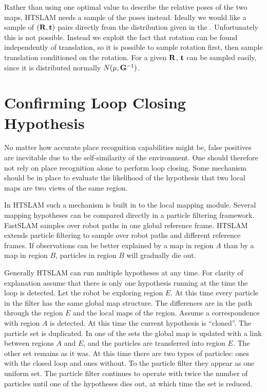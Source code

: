 Rather than using one optimal value to describe the relative poses of
the two maps, HTSLAM needs a sample of the poses instead. Ideally we
would like a sample of $({\bf R,t})$ pairs directly from the
distribution given in the . Unfortunately
this is not possible. Instead we exploit the fact that rotation
can be found independently of translation, so it is possible to sample
rotation first, then sample translation conditioned on the
rotation. For a given ${\bf R}$, ${\bf t}$ can be sampled easily,
since it is distributed normally $N(\mu, {\bf G}^{-1})$.



\section{Confirming Loop Closing Hypothesis}
\label{sec:loop_confirm}

No matter how accurate place recognition capabilities might be, false
positives are inevitable due to the self-similarity of the
environment. One should therefore not rely on place recognition alone
to perform loop closing. Some mechanism should be in place to evaluate
the likelihood of the hypothesis that two local maps are two views of
the same region.

In HTSLAM such a mechanism is built in to the local mapping
module. Several mapping hypotheses can be compared directly in a
particle filtering framework. FastSLAM samples over robot paths in one
global reference frame. HTSLAM extends particle filtering to sample
over robot paths and different reference frames. If observations can
be better explained by a map in region $A$ than by a map in region
$B$, particles in region $B$ will gradually die out.

Generally HTSLAM can run multiple hypotheses at any time. For clarity
of explanation assume that there is only one hypothesis running at the
time the loop is detected. Let the robot be exploring region $E$. At
this time every particle in the filter has the same global map
structure. The differences are in the path through the region $E$ and
the local maps of the region. Assume a correspondence with region $A$
is detected. At this time the current hypothesis is ``cloned''. The
particle set is duplicated. In one of the sets the global map is
updated with a link between regions $A$ and $E$, and the particles are
transferred into region $E$. The other set remains as it was. At this
time there are two types of particles: ones with the closed loop and
ones without. To the particle filter they appear as one uniform
set. The particle filter continues to operate with twice the number of
particles until one of the hypotheses dies out, at which time the set
is reduced.


